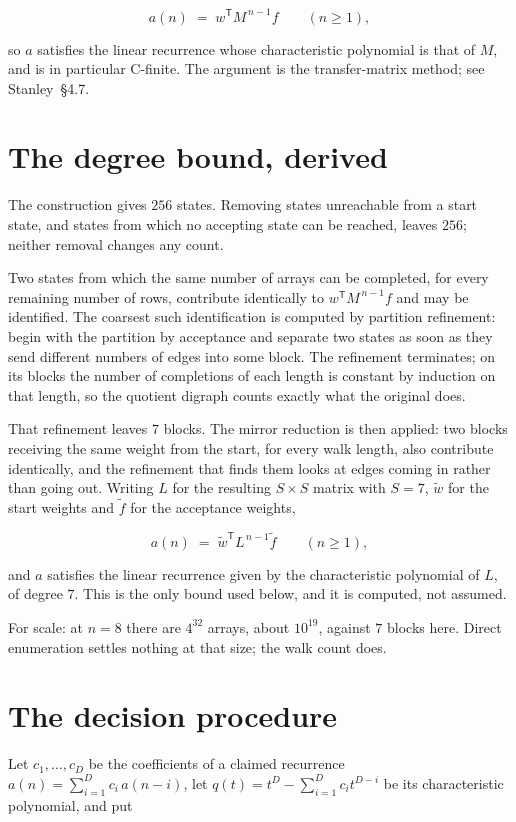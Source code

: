 \documentclass[11pt]{article}
\theoremstyle{definition}
\begin{document}
\[a(n) \;=\; w^{\mathsf T} M^{\,n-1} f \qquad (n \ge 1),\]

so $a$ satisfies the linear recurrence whose characteristic polynomial is that of $M$, and is in particular C-finite. The argument is the transfer-matrix method; see Stanley~\S4.7.

\section{The degree bound, derived}

The construction gives $256$ states. Removing states unreachable from a start state, and states from which no accepting state can be reached, leaves $256$; neither removal changes any count.

Two states from which the same number of arrays can be completed, for every remaining number of rows, contribute identically to $w^{\mathsf T}M^{\,n-1}f$ and may be identified. The coarsest such identification is computed by partition refinement: begin with the partition by acceptance and separate two states as soon as they send different numbers of edges into some block. The refinement terminates; on its blocks the number of completions of each length is constant by induction on that length, so the quotient digraph counts exactly what the original does.

That refinement leaves $7$ blocks. The mirror reduction is then applied: two blocks receiving the same weight from the start, for every walk length, also contribute identically, and the refinement that finds them looks at edges coming in rather than going out. Writing $L$ for the resulting $S \times S$ matrix with $S = 7$, $\tilde w$ for the start weights and $\tilde f$ for the acceptance weights,

\[a(n) \;=\; \tilde w^{\mathsf T} L^{\,n-1} \tilde f \qquad (n \ge 1),\]

and $a$ satisfies the linear recurrence given by the characteristic polynomial of $L$, of degree $7$. This is the only bound used below, and it is computed, not assumed.

For scale: at $n = 8$ there are $4^{32}$ arrays, about $10^{19}$, against $7$ blocks here. Direct enumeration settles nothing at that size; the walk count does.

\section{The decision procedure}

Let $c_1,\dots,c_D$ be the coefficients of a claimed recurrence $a(n) = \sum_{i=1}^{D} c_i\,a(n-i)$, let $q(t) = t^{D} - \sum_{i=1}^{D} c_i t^{D-i}$ be its characteristic polynomial, and put
\end{document}
